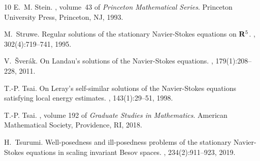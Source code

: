 \documentclass[12pt]{amsart}
\begin{document}
\begin{thebibliography}{10}
	E.~M. Stein.
	, volume~43 of {\em Princeton Mathematical Series}.
	\newblock Princeton University Press, Princeton, NJ, 1993.
	
	M.~Struwe.
	\newblock Regular solutions of the stationary {N}avier-{S}tokes equations on
	{$\bold R^5$}.
	, 302(4):719--741, 1995.
	
	V.~{\v{S}}ver\'{a}k.
	\newblock On {L}andau's solutions of the {N}avier-{S}tokes equations.
	, 179(1):208--228, 2011.
	
	T.-P. Tsai.
	\newblock On {L}eray's self-similar solutions of the {N}avier-{S}tokes
	equations satisfying local energy estimates.
	, 143(1):29--51, 1998.
	
	T.-P. Tsai.
	, volume 192 of {\em
		Graduate Studies in Mathematics}.
	\newblock American Mathematical Society, Providence, RI, 2018.
	
	H.~Tsurumi.
	\newblock Well-posedness and ill-posedness problems of the stationary
	{N}avier-{S}tokes equations in scaling invariant {B}esov spaces.
	, 234(2):911--923, 2019.
	
\end{thebibliography}
\end{document}
